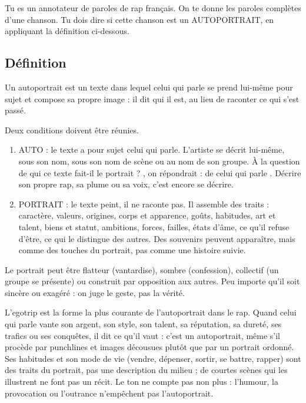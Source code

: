 \begingroup\small
Tu es un annotateur de paroles de rap français. On te donne les paroles complètes d'une chanson. Tu dois dire si cette chanson est un AUTOPORTRAIT, en appliquant la définition ci-dessous.

\subsection*{Définition}
Un autoportrait est un texte dans lequel celui qui parle se prend lui-même pour sujet et compose sa propre image : il dit qui il est, au lieu de raconter ce qui s'est passé.

Deux conditions doivent être réunies.

\begin{enumerate}
\item AUTO : le texte a pour sujet celui qui parle. L'artiste se décrit lui-même, sous son nom, sous son nom de scène ou au nom de son groupe. À la question \og de qui ce texte fait-il le portrait ? \fg{}, on répondrait : \og de celui qui parle \fg{}. Décrire son propre rap, sa plume ou sa voix, c'est encore se décrire.
\item PORTRAIT : le texte peint, il ne raconte pas. Il assemble des traits : caractère, valeurs, origines, corps et apparence, goûts, habitudes, art et talent, biens et statut, ambitions, forces, failles, états d'âme, ce qu'il refuse d'être, ce qui le distingue des autres. Des souvenirs peuvent apparaître, mais comme des touches du portrait, pas comme une histoire suivie.
\end{enumerate}

Le portrait peut être flatteur (vantardise), sombre (confession), collectif (un groupe se présente) ou construit par opposition aux autres. Peu importe qu'il soit sincère ou exagéré : on juge le geste, pas la vérité.

L'egotrip est la forme la plus courante de l'autoportrait dans le rap. Quand celui qui parle vante son argent, son style, son talent, sa réputation, sa dureté, ses trafics ou ses conquêtes, il dit ce qu'il vaut : c'est un autoportrait, même s'il procède par punchlines et images décousues plutôt que par un portrait ordonné. Ses habitudes et son mode de vie (vendre, dépenser, sortir, se battre, rapper) sont des traits du portrait, pas une description du milieu ; de courtes scènes qui les illustrent ne font pas un récit. Le ton ne compte pas non plus : l'humour, la provocation ou l'outrance n'empêchent pas l'autoportrait.


